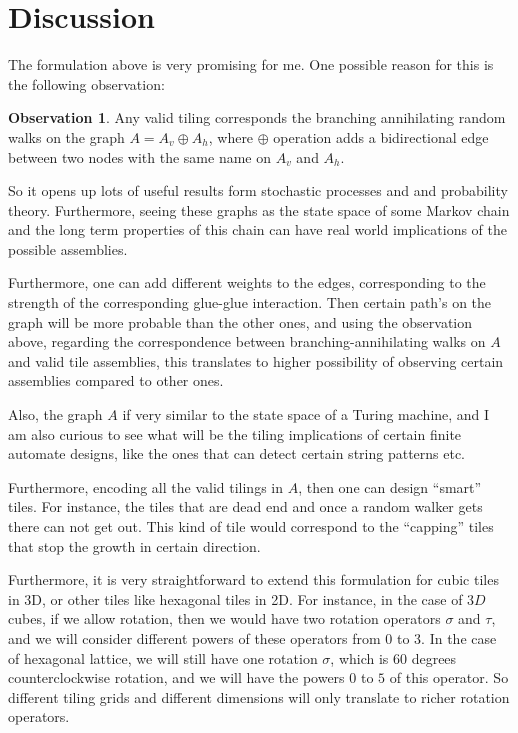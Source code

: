 \documentclass[11pt,a4paper]{article}
\theoremstyle{definition}
\theoremstyle{remark}
\theoremstyle{definition}
\newtheorem{observation}{Observation}
\begin{document}
	
	
	\section{Discussion}
	The formulation above is very promising for me. One possible reason for this is the following observation:
	\begin{observation}
		Any valid tiling corresponds the branching annihilating random walks on the graph $ A = A_v \oplus A_h $, where $ \oplus $ operation adds a bidirectional edge between two nodes with the same name on $ A_v $ and $ A_h $.
	\end{observation}
	So it opens up lots of useful results form stochastic processes and and probability theory. Furthermore, seeing these graphs as the state space of some Markov chain and the long term properties of this chain can have real world implications of the possible assemblies. 
	
	Furthermore, one can add different weights to the edges, corresponding to the strength of the corresponding glue-glue interaction. Then certain path's on the graph will be more probable than the other ones, and using the observation above, regarding the correspondence between branching-annihilating walks on $ A $ and valid tile assemblies, this translates to higher possibility of observing certain assemblies compared to other ones.
	
	Also, the graph $ A $ if very similar to the state space of a Turing machine, and I am also curious to see what will be the tiling implications of certain finite automate designs, like the ones that can detect certain string patterns etc.
	
	Furthermore, encoding all the valid tilings in $ A $, then one can design ``smart'' tiles. For instance, the tiles that are dead end and once a random walker gets there can not get out. This kind of tile would correspond to the ``capping'' tiles that stop the growth in certain direction.
	
	Furthermore, it is very straightforward to extend this formulation for cubic tiles in 3D, or other tiles like hexagonal tiles in 2D. For instance, in the case of $ 3D $ cubes, if we allow rotation, then we would have two rotation operators $ \sigma $ and $ \tau $, and we will consider different powers of these operators from 0 to 3. In the case of hexagonal lattice, we will still have one rotation $ \sigma $, which is 60 degrees counterclockwise rotation, and we will have the powers $ 0 $ to $ 5 $ of this operator. So different tiling grids and different dimensions will only translate to richer rotation operators.  
	
	
	
\end{document}
